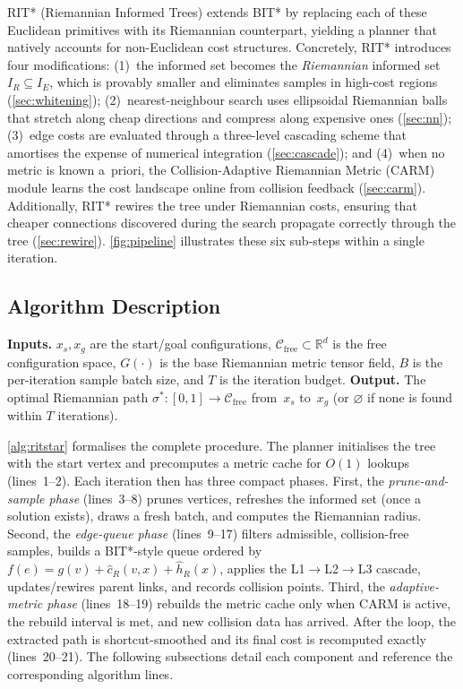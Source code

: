 \documentclass[journal]{IEEEtran}
\newcommand{\Cfree}{\mathcal{C}_{\mathrm{free}}}
\newcommand{\IR}{I_{\!R}}
\newcommand{\IE}{I_{\!E}}
\begin{document}
RIT* (Riemannian Informed Trees) extends BIT* by replacing each of
these Euclidean primitives with its Riemannian counterpart,
yielding a planner that natively accounts for non-Euclidean cost
structures.
Concretely, RIT* introduces four modifications:
(1)~the informed set becomes the \emph{Riemannian} informed
set~$\IR \subseteq \IE$, which is provably smaller and eliminates
samples in high-cost regions (\cref{sec:whitening});
(2)~nearest-neighbour search uses ellipsoidal Riemannian balls that
stretch along cheap directions and compress along expensive ones
(\cref{sec:nn});
(3)~edge costs are evaluated through a three-level cascading scheme
that amortises the expense of numerical integration
(\cref{sec:cascade});
and (4)~when no metric is known a~priori, the Collision-Adaptive
Riemannian Metric (CARM) module learns the cost landscape online
from collision feedback (\cref{sec:carm}).
Additionally, RIT* rewires the tree under Riemannian costs, ensuring
that cheaper connections discovered during the search propagate
correctly through the tree (\cref{sec:rewire}).
\cref{fig:pipeline} illustrates these six sub-steps within a single
iteration.

\subsection{Algorithm Description}\label{sec:algorithm}
\textbf{Inputs.}
$x_s, x_g$ are the start/goal configurations,
$\Cfree \subset \mathbb{R}^d$ is the free configuration space,
$G(\cdot)$ is the base Riemannian metric tensor field,
$B$ is the per-iteration sample batch size,
and $T$ is the iteration budget.
\textbf{Output.} The optimal Riemannian path $\sigma^{\!*}:[0,1]\!\to\!\Cfree$
from~$x_s$ to~$x_g$ (or $\varnothing$ if none is found within $T$ iterations).

\cref{alg:ritstar} formalises the complete procedure.
The planner initialises the tree with the start vertex and
precomputes a metric cache for $O(1)$ lookups (lines~1--2).
Each iteration then has three compact phases.
First, the \emph{prune-and-sample phase} (lines~3--8) prunes vertices,
refreshes the informed set (once a solution exists), draws a fresh
batch, and computes the Riemannian radius.
Second, the \emph{edge-queue phase} (lines~9--17) filters admissible,
collision-free samples, builds a BIT*-style queue ordered by
$f(e)=g(v)+\hat{c}_R(v,x)+\hat{h}_R(x)$, applies the L1$\to$L2$\to$L3
cascade, updates/rewires parent links, and records collision points.
Third, the \emph{adaptive-metric phase} (lines~18--19) rebuilds the
metric cache only when CARM is active, the rebuild interval is met,
and new collision data has arrived.
After the loop, the extracted path is shortcut-smoothed and its final
cost is recomputed exactly (lines~20--21).
The following subsections detail each component and reference the
corresponding algorithm lines.
\end{document}
